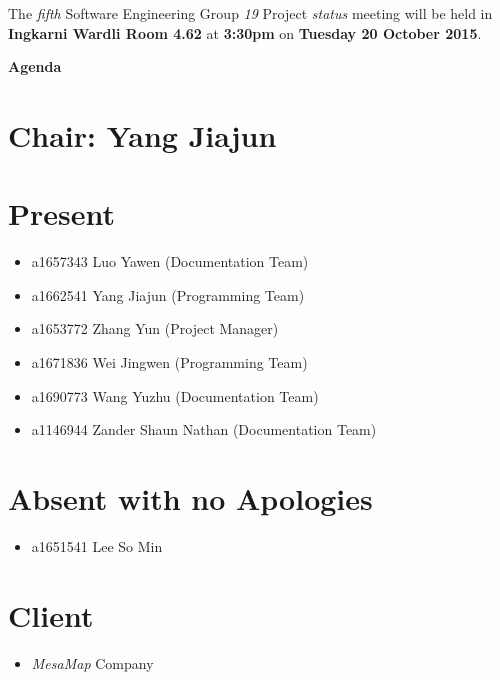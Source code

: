 \documentclass[a4paper] {article}
\begin{document}
	
	\vspace*{-50pt}
	
	\noindent The \emph{fifth} Software Engineering Group \emph{19} Project \emph{status} meeting will
	be held in \textbf{Ingkarni Wardli Room 4.62} at \textbf {3:30pm} on \textbf{Tuesday 20 October 2015}.
	
	
	\begin{center}
		\huge \textbf {Agenda}
	\end{center}
	

	\section*{Chair: Yang Jiajun}
	
	\vspace*{10pt}
	
	\section{Present}
	\begin{itemize}
		\item a1657343 Luo Yawen (Documentation Team)
		\item a1662541 Yang Jiajun (Programming Team)
		\item a1653772 Zhang Yun (Project Manager)
		\item a1671836 Wei Jingwen (Programming Team)
		\item a1690773 Wang Yuzhu (Documentation Team)
		\item a1146944 Zander Shaun Nathan (Documentation Team)
	\end{itemize}
	
	\section{Absent with no Apologies}
	\begin{itemize}
		\item a1651541 Lee So Min
	\end{itemize}  
	
        \section{Client}
        \begin{itemize}
            \item \emph{MesaMap} Company
        \end{itemize} 
	
\end{document}
